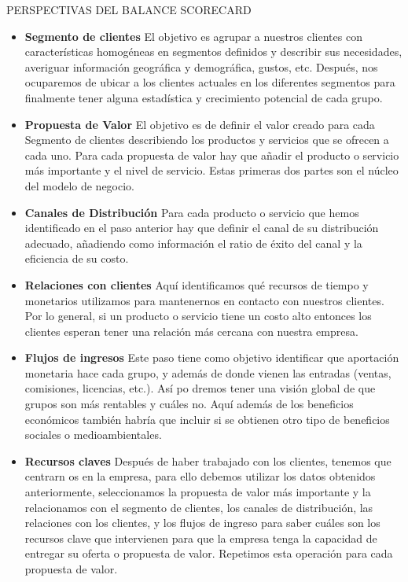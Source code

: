 PERSPECTIVAS DEL BALANCE SCORECARD \newline

\begin{itemize}
\item \textbf{Segmento de clientes} El objetivo es agrupar a nuestros clientes con características homogéneas en segmentos definidos y describir sus necesidades, averiguar información geográfica y demográfica, gustos, etc. Después, nos ocuparemos de ubicar a los clientes actuales en los diferentes segmentos para finalmente tener alguna estadística y crecimiento potencial de cada grupo. 

\item \textbf{Propuesta de Valor} El objetivo es de definir el valor creado para cada Segmento de clientes describiendo los productos y servicios que se ofrecen a cada uno. Para cada propuesta de valor hay que añadir el producto o servicio más importante y el nivel de servicio. Estas primeras dos partes son el núcleo del modelo de negocio.


\item \textbf{Canales de Distribución} Para cada producto o servicio que hemos identificado en el paso anterior hay que definir el canal de su distribución adecuado, añadiendo como información el ratio de éxito del canal y la eficiencia de su costo. 


\item \textbf{Relaciones con clientes} Aquí identificamos qué recursos de tiempo y monetarios utilizamos para mantenernos en contacto con nuestros clientes. Por lo general, si un producto o servicio tiene un costo alto entonces los clientes esperan tener una relación más cercana con nuestra empresa.  


\item \textbf{Flujos de ingresos} Este paso tiene como objetivo identificar que aportación monetaria hace cada grupo, y además de donde vienen las entradas (ventas, comisiones, licencias, etc.). Así po dremos tener una visión global de que grupos son más rentables y cuáles no. Aquí además de los beneficios económicos también habría que incluir si se obtienen otro tipo de beneficios sociales o medioambientales. 

\item \textbf{Recursos claves} Después de haber trabajado con los clientes, tenemos que centrarn os en la empresa, para ello debemos utilizar los datos obtenidos anteriormente, seleccionamos la propuesta de valor más importante y la relacionamos con el segmento de clientes, los canales de distribución, las relaciones con los clientes, y los flujos de ingreso para saber cuáles son los recursos clave que intervienen para que la empresa tenga la capacidad de entregar su oferta o propuesta de valor. Repetimos esta operación para cada propuesta de valor. 


\end{itemize}
